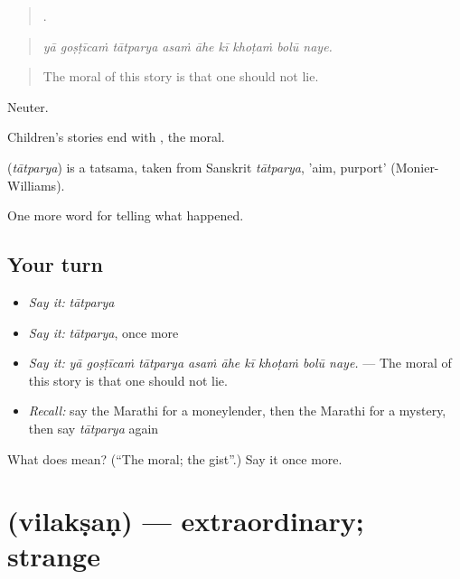 \begin{quote}
        .
\end{quote}

\begin{quote}
\emph{yā goṣṭīcaṁ tātparya asaṁ āhe kī khoṭaṁ bolū naye.}
\end{quote}

\begin{quote}
The moral of this story is that one should not lie.
\end{quote}

Neuter.

Children's stories end with , the moral.

\begin{cousinweb}
\textbf{} (\emph{tātparya}) is a tatsama, taken from Sanskrit \emph{tātparya}, 'aim, purport' (Monier-Williams).
\end{cousinweb}

\begin{grammarlens}[title={What you've built}]
One more word for telling what happened.
\end{grammarlens}

\subsection*{Your turn}
\begin{itemize}
\raggedright
  \item \emph{Say it:} \emph{tātparya}
  \item \emph{Say it:} \emph{tātparya}, once more
  \item \emph{Say it:} \emph{yā goṣṭīcaṁ tātparya asaṁ āhe kī khoṭaṁ bolū naye.} — The moral of this story is that one should not lie.
  \item \emph{Recall:} say the Marathi for a moneylender, then the Marathi for a mystery, then say \emph{tātparya} again
\end{itemize}

\begin{tcolorbox}[breakable,colback=teal!4,colframe=teal!35!black,title={Before you move on}]
What does  mean? (\textquotedblleft{}The moral; the gist\textquotedblright{}.) Say it once more.
\end{tcolorbox}
\section[\texorpdfstring{\mr{विलक्षण} (vilakṣaṇ)}{विलक्षण (vilakṣaṇ)}]{ (vilakṣaṇ) — extraordinary; strange}

